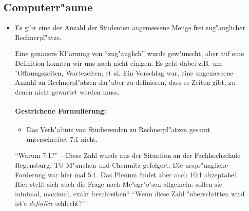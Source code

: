 \subsection{Computerr"aume}
\begin{itemize}
	\item Es gibt eine der Anzahl der Studenten angemessene Menge frei zug"anglicher Rechnerpl"atze.
\begin{kcmt}\begin{komacmt}
	Eine genauere Kl"arnung von "`zug"anglich"' wurde gew"unscht, aber auf eine Definition konnten wir uns noch nicht einigen. Es geht dabei z.B. um "Offnungszeiten, Wartezeiten, et al. Ein Vorschlag war, eine angemessene Anzahl an Rechnerpl"atzen dar"uber zu definieren, dass es Zeiten gibt, zu denen nicht gewartet werden muss.

	\paragraph{Gestrichene Formulierung:} \begin{itemize}
	\item Das Verh"altnis von Studierenden zu Rechnerpl"atzen gesamt unterschreitet 7:1 nicht.
	\end{itemize}

	"`Warum 7:1?"' -- Diese Zahl wurde aus der Situation an der Fachhochschule Regensburg,
	TU M"unchen und Chemnitz gefolgert. Die urspr"ungliche Forderung war hier mal 5:1.
	Das Plenum findet aber auch 10:1 akzeptabel. Hier stellt sich auch die Frage nach
	Me"sgr"o"sen allgemein: sollen sie minimal, maximal, exakt beschreiben? "`Wenn diese
	Zahl "uberschritten wird ist's \emph{definitiv} schlecht?"'


\end{komacmt}
\end{kcmt}
\end{itemize}
